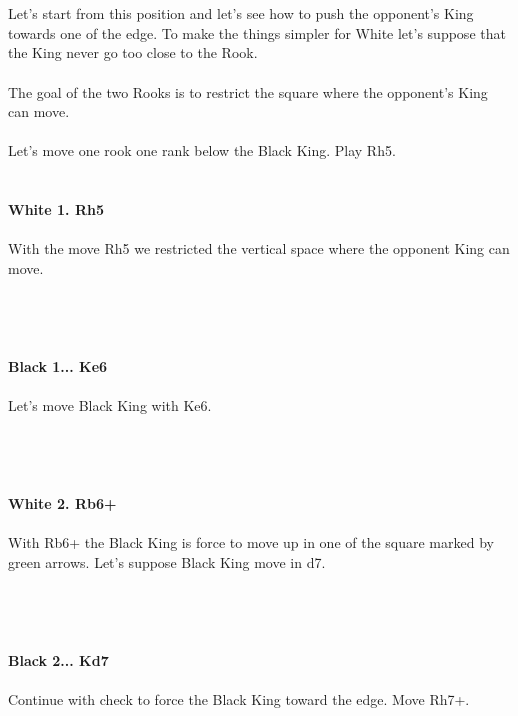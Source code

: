 \documentclass{article}
\begin{document}

\\
\\
Let's start from this position and let's see how to push the opponent's King towards one of the edge. To make the things simpler for White let's suppose that the King never go too close to the Rook.\\\\The goal of the two Rooks is to restrict the square where the opponent's King can move.\\\\Let's move one rook one rank below the Black King. Play Rh5.\\

\\
\\
\textbf{White 1. Rh5}\\
\\
With the move Rh5 we restricted the vertical space where the opponent King can move.\\\\
\\

\\
\\
\textbf{Black 1... Ke6}\\
\\
Let's move Black King with Ke6.\\\\
\\

\\
\\
\textbf{White 2. Rb6+}\\
\\
With Rb6+ the Black King is force to move up in one of the square marked by green arrows. Let's suppose Black King move in d7.\\\\
\\

\\
\\
\textbf{Black 2... Kd7}\\
\\
Continue with check to force the Black King toward the edge. Move Rh7+.\\\\
\end{document}
